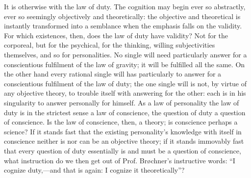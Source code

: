 \documentclass[12pt]{book}
\newcommand{\opage}[1]{\marginnote{\footnotesize\textit{[#1]}}}
\begin{document}
It is otherwise with the law of duty. The cognition may begin ever so
abstractly, ever so seemingly objectively and theoretically: the
objective and theoretical is instantly transformed into a semblance when
the emphasis falls on the validity. For which existences, then, does the
law of duty have validity? Not for the corporeal, but for the psychical,
for the thinking, willing subjectivities themselves, and so for
personalities. No single will need particularly answer for a
conscientious fulfilment of the law of gravity; it will be fulfilled all
the same. On the other hand every rational single will has particularly
to answer for a conscientious fulfilment of the law of duty; the one
single will is not, by virtue of any objective theory, to trouble itself
with answering for the other: each is in his singularity to answer
personally for himself. As a law of personality the law of duty is in
the strictest sense a law of conscience, the question of duty a question
of conscience. Is the law of conscience, then, a theory; is conscience
perhaps a science? If it stands fast that the existing personality's
knowledge with itself in conscience neither is nor can be an objective
theory; if it stands immovably fast that every question of duty
essentially is and must be a question of conscience, what instruction do
we then get out of Prof.
\opage{29}\setcounter{footnote}{0}%
Brøchner's instructive words: ``I cognize duty,---and that is again: I
cognize it theoretically''?

\end{document}
